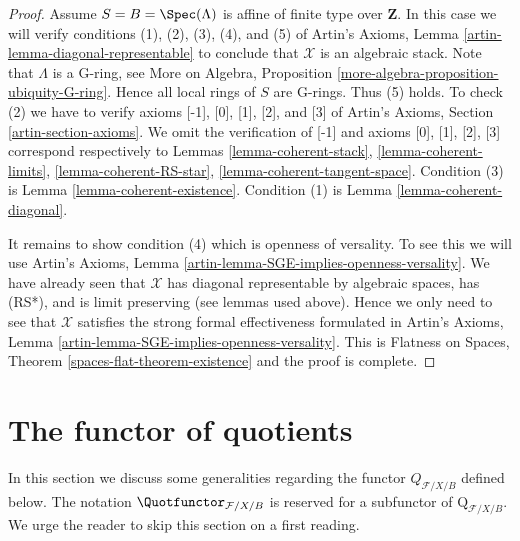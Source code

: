 \begin{proof}
\medskip\noindent
Assume $S = B = \Spec(\Lambda)$ is affine of finite type over $\mathbf{Z}$.
In this case we will verify conditions (1), (2), (3), (4), and (5) of
Artin's Axioms, Lemma \ref{artin-lemma-diagonal-representable}
to conclude that $\mathcal{X}$ is an algebraic stack.
Note that $\Lambda$ is a G-ring, see
More on Algebra, Proposition \ref{more-algebra-proposition-ubiquity-G-ring}.
Hence all local rings of $S$ are G-rings. Thus (5) holds.
To check (2) we have to verify axioms [-1], [0], [1], [2], and [3]
of Artin's Axioms, Section \ref{artin-section-axioms}.
We omit the verification of [-1] and axioms
[0], [1], [2], [3] correspond respectively to
Lemmas \ref{lemma-coherent-stack},
\ref{lemma-coherent-limits},
\ref{lemma-coherent-RS-star},
\ref{lemma-coherent-tangent-space}.
Condition (3) is Lemma \ref{lemma-coherent-existence}.
Condition (1) is Lemma \ref{lemma-coherent-diagonal}.

\medskip\noindent
It remains to show condition (4) which is openness of versality.
To see this we will use
Artin's Axioms, Lemma \ref{artin-lemma-SGE-implies-openness-versality}.
We have already seen that $\mathcal{X}$ has diagonal
representable by algebraic spaces, has (RS*), and is limit preserving
(see lemmas used above).
Hence we only need to see that $\mathcal{X}$ satisfies the strong
formal effectiveness formulated in
Artin's Axioms, Lemma \ref{artin-lemma-SGE-implies-openness-versality}.
This is Flatness on Spaces, Theorem \ref{spaces-flat-theorem-existence}
and the proof is complete.
\end{proof}









\section{The functor of quotients}
\label{section-functor-quotients}

\noindent
In this section we discuss some generalities regarding the functor
$Q_{\mathcal{F}/X/B}$ defined below.
The notation $\Quotfunctor_{\mathcal{F}/X/B}$ is reserved for a
subfunctor of $\text{Q}_{\mathcal{F}/X/B}$.
We urge the reader to skip this section on a first reading.

